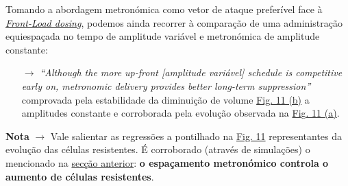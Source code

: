 Tomando a abordagem metronómica como vetor de ataque preferível face à \hyperref[subsubsec:front-load-dosing]{\textit{Front-Load dosing}}, podemos ainda recorrer à comparação de uma administração equiespaçada no tempo de amplitude variável e metronómica de amplitude constante:
\vspace{-0.8em}
\begin{itemize}
    \item[$\rightarrow$] \textit{``Although the more up-front [amplitude variável] schedule is competitive early on, metronomic delivery provides better long-term suppression''}\cite{Hahnfeldt2003-oy} comprovada pela estabilidade da diminuição de volume \hyperref[fig:AmpVarDoc]{Fig. 11 (b)} a amplitudes constante e corroborada pela evolução observada na \hyperref[fig:AmpVarDoc]{Fig. 11 (a)}.
\end{itemize}

\noindent\textbf{Nota} $\rightarrow$ Vale salientar as regressões a pontilhado na \hyperref[fig:AmpVarDoc]{Fig. 11} representantes da evolução das células resistentes. É corroborado (através de simulações) o mencionado na \hyperref[subsubsec:metronomic-dosing]{secção anterior}: \textbf{o espaçamento metronómico controla o aumento de células resistentes}.
